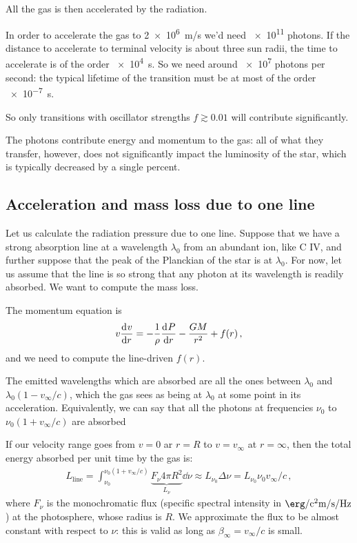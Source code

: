 \documentclass[main.tex]{subfiles}
\begin{document}
All the gas is then accelerated by the radiation.

In order to accelerate the gas to \SI{2e6}{m/s} we'd need \num{e11} photons.
If the distance to accelerate to terminal velocity is about three sun radii, the time to accelerate is of the order \SI{e4}{s}.
So we need around \num{e7} photons per second: the typical lifetime of the transition must be at most of the order \SI{e-7}{s}.

So only transitions with oscillator strengths \(f \gtrsim 0.01\) will contribute significantly.


The photons contribute energy and momentum to the gas: all of what they transfer, however, does not significantly impact the luminosity of the star, which is typically decreased by a single percent.

\subsection{Acceleration and mass loss due to one line}

Let us calculate the radiation pressure due to one line.
Suppose that we have a strong absorption line at a wavelength \(\lambda_0 \) from an abundant ion, like C IV, and further suppose that the peak of the Planckian of the star is at \(\lambda_0 \). 
For now, let us assume that the line is so strong that any photon at its wavelength is readily absorbed.
We want to compute the mass loss.

The momentum equation is 
%
\begin{align}
  v \dv[]{v}{r} = - \frac{1}{\rho } \dv[]{P}{r} - \frac{GM}{r^2} + f(r)
\,,
\end{align}
%
and we need to compute the line-driven \(f(r)\).

The emitted wavelengths which are absorbed are all the ones between \(\lambda_0\) and \(\lambda_0 (1 - v_{\infty}/c)\), which the gas sees as being at \(\lambda_0 \) at some point in its acceleration. Equivalently, we can say that all the photons at frequencies \(\nu_0 \) to \(\nu_0 (1+v_{ \infty } /c)\) are absorbed

If our velocity range goes from \(v=0\) ar \(r = R\) to \(v = v_{\infty}\) at \(r = \infty\), then the total energy absorbed per unit time by the gas is: 
%
\begin{align}
  L _{\text{line}} = \int _{\nu_0 }^{\nu_0 (1 + v_{\infty}/c)} \underbrace{F_\nu 4 \pi R^2}_{{L_{\nu}}} \dd{\nu } \approx L_{\nu_0 } \Delta \nu = L_{\nu_0 } \nu_0 v_{\infty} /c
\,,
\end{align}
%
where \(F_{\nu }\) is the monochromatic flux (specific spectral intensity in \(\SI{}{\erg\per\square\centi\metre\per\second\per\hertz}\)) at the photosphere, whose radius is \(R\).
We approximate the flux to be almost constant with respect to \(\nu \): this is valid as long as \(\beta_{ \infty } = v_{ \infty }/c\) is small.
\end{document}
